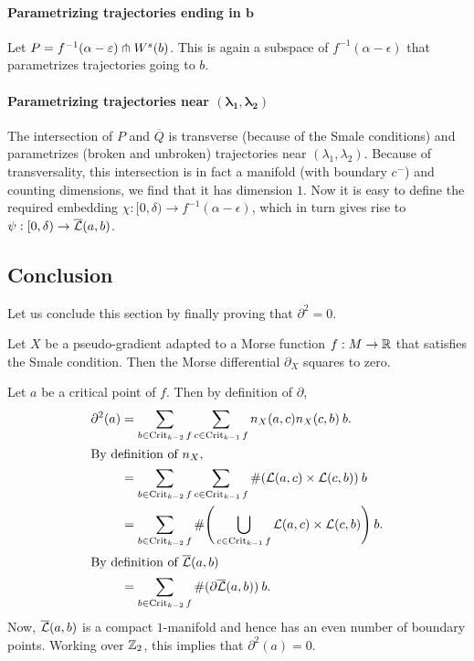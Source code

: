 \begin{myproof}
    \paragraph{Parametrizing trajectories ending in $\bm{b}$}
    Let $P = f^{-1}(\alpha - \varepsilon) \pitchfork W^s(b)$.
    This is again a subspace of $f^{-1}(\alpha-\epsilon)$ that parametrizes trajectories going to $b$.

    \paragraph{Parametrizing trajectories near $\bm{(\lambda_1, \lambda_2)}$}
    The intersection of $P$ and  $\overline{Q}$ is transverse (because of the Smale conditions) and parametrizes (broken and unbroken) trajectories near $(\lambda_1, \lambda_2)$.
    Because of transversality, this intersection is in fact a manifold (with boundary $c^{-}$) and counting dimensions, we find that it has dimension $1$.
    Now it is easy to define the required embedding $\chi: [0, \delta) \to  f^{-1}(\alpha-\epsilon)$, which in turn gives rise to $\psi: [0, \delta) \to  \overline{\mathcal L}(a, b)$.\end{myproof}
\subsection{Conclusion}

Let us conclude this section by finally proving that $\partial^2 = 0$.
\begin{theorem}
    Let $X$ be a pseudo-gradient adapted to a Morse function  $f: M \to  \mathbb{R}$ that satisfies the Smale condition.
    Then the Morse differential $\partial_X$ squares to zero.
\end{theorem}
\begin{myproof}
    Let $a$ be a critical point of $f$.
    Then by definition of $\partial$,
    \begin{align*}
        \partial^2(a)
        &= 
        \sum_{b \in  \operatorname{Crit}_{k-2}f}
        \sum_{c \in  \operatorname{Crit}_{k-1}f}
        n_X(a, c) n_X(c, b) \: b.\\
        \shortintertext{By definition of $n_X$,}
        &= 
        \sum_{b \in  \operatorname{Crit}_{k-2}f}
        \sum_{c \in  \operatorname{Crit}_{k-1}f}
        \# (\mathcal L(a, c) \times \mathcal L(c, b)) \:  b\\
        &= 
        \sum_{b \in  \operatorname{Crit}_{k-2}f}
        \# \Bigg(\bigcup_{c \in  \operatorname{Crit}_{k-1}f}
        \mathcal L(a, c) \times \mathcal L(c, b)\Bigg) \:  b.\\
        \shortintertext{By definition of $\overline{\mathcal L}(a, b)$}
        &= \sum_{b \in  \operatorname{Crit}_{k-2}f} \# (\partial \overline{\mathcal L}(a, b))\:  b.
    \end{align*} 
    Now, $\overline{\mathcal L}(a, b)$ is a compact  $1$-manifold and hence has an even number of boundary points. Working over $ \mathbb{Z}_2$, this implies that $\partial^2(a) = 0$.
\end{myproof}

